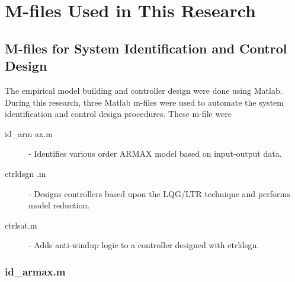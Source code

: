 \chapter{M-files Used in This Research}

\section{M-files for System Identification and Control Design}

\tab The empirical model building and controller design were done using Matlab. During this
research, three Matlab m-files were used to automate the system identification and control
design procedures. These m-file were

\begin{description}
	\item[id\_arm ax.m] - Identifies various order ARMAX model based on input-output data.
	\item[ctrldsgn .m] - Designs controllers based upon the LQG/LTR technique and performs model reduction.
	\item[ctrlsat.m] - Adds anti-windup logic to a controller designed with ctrldsgn.
\end{description}

\newpage

\subsection{id\_armax.m}

